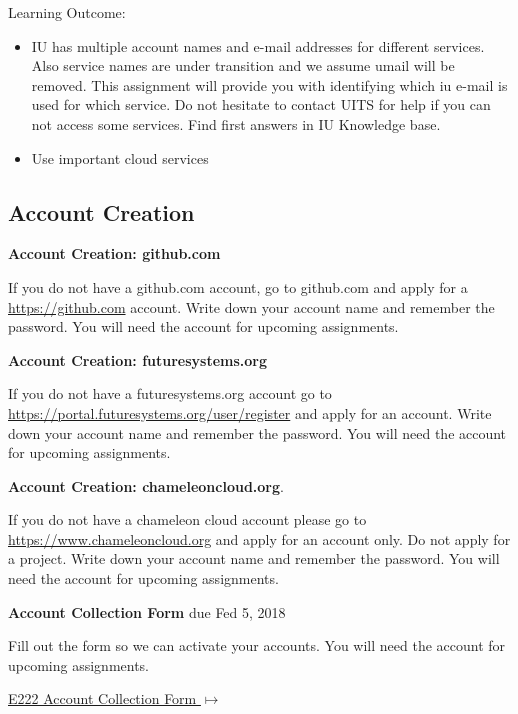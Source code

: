 Learning Outcome:

\begin{itemize}
\item IU has multiple account names and e-mail addresses for different
  services. Also service names are under transition and we assume
  umail will be removed. This assignment will provide you with
  identifying which iu e-mail is used for which service. Do not
  hesitate to contact UITS for help if you can not access some
  services. Find first answers in IU Knowledge base.
\item Use important cloud services
\end{itemize}


\subsection{Account Creation}

\begin{exercise}

  {\bf Account Creation: github.com}
  
  If you do not have a github.com
  account, go to github.com and apply for a \url{https://github.com}
  account. Write down your account name and remember the password. You
  will need the account for upcoming assignments.

\end{exercise}

\begin{exercise}

  {\bf Account Creation: futuresystems.org}
  
  If you do not have a futuresystems.org account go to
  \url{https://portal.futuresystems.org/user/register} and apply for an
  account. Write down your account name and remember the password. You
  will need the account for upcoming assignments.

\end{exercise}

\begin{exercise}
  {\bf Account Creation: chameleoncloud.org}. 
  
  If you do not have a chameleon cloud account please go to 
  \url{https://www.chameleoncloud.org} and apply for an
  account only. Do not apply for a project. Write down your account
  name and remember the password. You will need the account for
  upcoming assignments.
\end{exercise}

\begin{exercise}
   {\bf Account Collection Form } due Fed 5, 2018
 
 Fill out the form so we can activate your accounts. You will need the account for upcoming assignments.
 
  {\hfill \href{https://goo.gl/forms/W0MdgoJoY8F6Vt9Q2}{E222 Account Collection Form $\mapsto$}}
 

\end{exercise}

